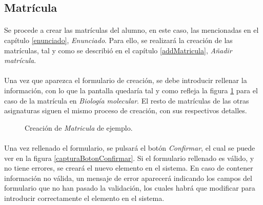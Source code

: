 \subsection{Matrícula}

  \paragraph{}Se procede a crear las matrículas del alumno,
  en este caso, las mencionadas en el capítulo \ref{enunciado},
  \textit{Enunciado}. Para ello, se realizará la creación de las matrículas,
  tal y como se describió en el capítulo \ref{addMatricula},
  \textit{Añadir matrícula}.

  \paragraph{}Una vez que aparezca el formulario de creación, se debe introducir
  rellenar la información, con lo que la pantalla quedaría tal y como
  refleja la figura \ref{ejemploAddMatricula} para el caso de la matrícula en
  \textit{Biología molecular}. El resto de matrículas de las otras asignaturas
  siguen el mismo proceso de creación, con sus respectivos detalles.

  \begin{figure}[!ht]
    \begin{center}
      \caption{Creación de \textit{Matricula} de ejemplo.}
      \label{ejemploAddMatricula}
    \end{center}
  \end{figure}

  \paragraph{}Una vez rellenado el formulario, se pulsará el botón
  \textit{Confirmar}, el cual se puede ver en la figura
  \ref{capturaBotonConfirmar}. Si el formulario rellenado es válido, y no tiene
  errores, se creará el nuevo elemento en el sistema. En caso de contener
  información no válida, un mensaje de error aparecerá indicando los campos
  del formulario que no han pasado la validación, los cuales habrá que modificar
  para introducir correctamente el elemento en el sistema.

